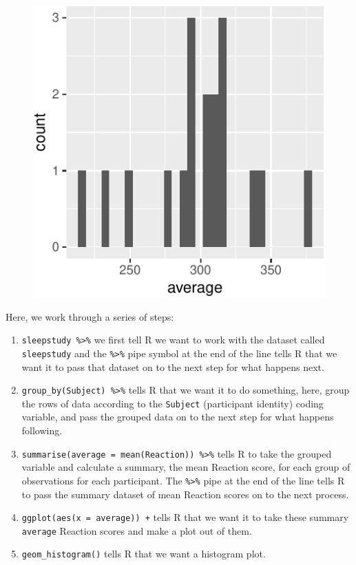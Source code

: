 \documentclass[
  letterpaper,
  DIV=11,
  numbers=noendperiod]{scrreprt}
\providecommand{\tightlist}{%
  \setlength{\itemsep}{0pt}\setlength{\parskip}{0pt}}\usepackage{longtable,booktabs,array}
\begin{document}
\begin{figure}[H]

{\centering \includegraphics{visualization_files/figure-pdf/unnamed-chunk-2-1.pdf}

}

\end{figure}

Here, we work through a series of steps:

\begin{enumerate}
\def\labelenumi{\arabic{enumi}.}
\tightlist
\item
  \texttt{sleepstudy\ \%\textgreater{}\%} we first tell R we want to
  work with the dataset called \texttt{sleepstudy} and the
  \texttt{\%\textgreater{}\%} pipe symbol at the end of the line tells R
  that we want it to pass that dataset on to the next step for what
  happens next.
\item
  \texttt{group\_by(Subject)\ \%\textgreater{}\%} tells R that we want
  it to do something, here, group the rows of data according to the
  \texttt{Subject} (participant identity) coding variable, and pass the
  grouped data on to the next step for what happens following.
\item
  \texttt{summarise(average\ =\ mean(Reaction))\ \%\textgreater{}\%}
  tells R to take the grouped variable and calculate a summary, the mean
  Reaction score, for each group of observations for each participant.
  The \texttt{\%\textgreater{}\%} pipe at the end of the line tells R to
  pass the summary dataset of mean Reaction scores on to the next
  process.
\item
  \texttt{ggplot(aes(x\ =\ average))\ +} tells R that we want it to take
  these summary \texttt{average} Reaction scores and make a plot out of
  them.
\item
  \texttt{geom\_histogram()} tells R that we want a histogram plot.
\end{enumerate}
\end{document}
